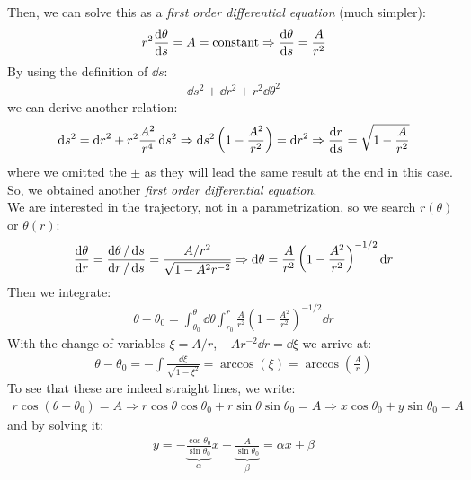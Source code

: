 \documentclass[../template.tex]{subfiles}
\begin{document}
\begin{example}
    Then, we can solve this as a \textit{first order differential equation} (much simpler):
    \begin{align*}
        r^2 \dv{\theta}{s} = A = \text{constant} \Rightarrow \dv{\theta}{s} = \frac{A}{r^2} 
    \end{align*} 
    By using the definition of $\dd{s}$:
    \begin{align*}
        \dd{s}^2 + \dd{r^2} + r^2 \dd{\theta}^2
    \end{align*} 
    we can derive another relation:
    \begin{align*}
        \dd{s^2} = \dd{r}^2 + r^2 \frac{A^2}{r^4} \dd{s^2} \Rightarrow \dd{s^2} \left(1-\frac{A^2}{r^2} \right)  = \dd{r}^2 \Rightarrow \dv{r}{s} = \sqrt{1-\frac{A}{r^2}} 
    \end{align*}
    where we omitted the $\pm$ as they will lead the same result at the end in this case. So, we obtained another \textit{first order differential equation}.\\
    We are interested in the trajectory, not in a parametrization, so we search $r(\theta)$ or $\theta(r)$:
    \begin{align*}
        \dv{\theta}{r} = \frac{\dd{\theta}/\dd{s}}{\dd{r}/\dd{s}} = \frac{A/r^2}{\sqrt{1-A^2 r^{-2}}} \Rightarrow \dd{\theta} = \frac{A}{r^2}\left(1-\frac{A^2}{r^2} \right)^{-1/2}\dd{r}
    \end{align*} 
    Then we integrate:
    \begin{align*}
        \theta - \theta_0 = \int_{\theta_0}^\theta \dd{\theta} \int_{r_0}^r \frac{A}{r^2} \left(1-\frac{A^2}{r^2} \right) ^{-1/2} \dd{r}
    \end{align*}
    With the change of variables $\xi = A/r$, $-A r^{-2} \dd{r = \dd{\xi}}$ we arrive at:
    \begin{align*}
        \theta - \theta_0 = - \int \frac{\dd{\xi}}{\sqrt{1-\xi^2}}  = \arccos (\xi) = \arccos \left(\frac{A}{r} \right)
    \end{align*} 
    To see that these are indeed straight lines, we write:
    \begin{align*}
        r\cos(\theta - \theta_0) = A \Rightarrow r\cos \theta \cos \theta_0 + r\sin \theta \sin\theta_0 = A \Rightarrow x \cos \theta_0 + y \sin \theta_0 = A
    \end{align*}
    and by solving it:
    \begin{align*}
        y = -\underbrace{\frac{\cos \theta_0}{\sin \theta_0} }_{\alpha}x + \underbrace{\frac{A}{\sin\theta_0}}_{\beta} = \alpha x + \beta  
    \end{align*}
\end{example}
\end{document}
